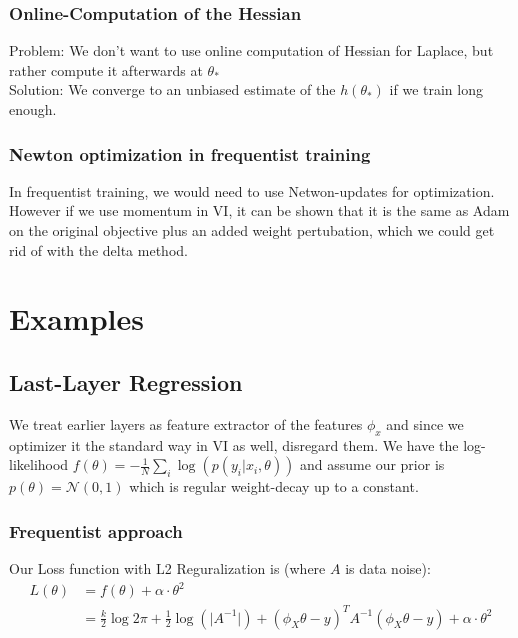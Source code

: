\documentclass[a4paper]{scrartcl}
\begin{document}
    \subsubsection{Online-Computation of the Hessian}
      Problem: We don't want to use online computation of Hessian for Laplace,
      but rather compute it afterwards at $\theta_*$\\
      Solution: We converge to an unbiased estimate of the $h(\theta_*)$ if we
      train long enough.

    \subsubsection{Newton optimization in frequentist training}
      In frequentist training, we would need to use Netwon-updates for optimization.
      However if we use momentum in VI, it can be shown that it is the same as
      Adam on the original objective plus an added weight pertubation, which we
      could get rid of with the delta method.



\section{Examples}

\subsection{Last-Layer Regression}
  We treat earlier layers as feature extractor of the features $\phi_x$ and
  since we optimizer it the standard way in VI as well, disregard them. We have
  the log-likelihood $f(\theta) = - \frac{1}{N} \sum_i \log(p(y_i \vert x_i,
  \theta))$ and assume our prior is $p(\theta) = \mathcal{N}(0, 1)$ which is
  regular weight-decay up to a constant.

  \subsubsection{Frequentist approach}
    Our Loss function with L2 Reguralization is (where $A$ is data noise):
    \begin{align*}
      L(\theta) &= f(\theta) + \alpha \cdot \theta^2 \\
      &= \frac{k}{2}\log{2\pi} + \frac{1}{2} \log(\vert A^{-1} \vert) + (\phi_{X}\theta - y)^T A^{-1} (\phi_{X}\theta - y) + \alpha \cdot \theta^2\\
    \end{align*}
\end{document}
